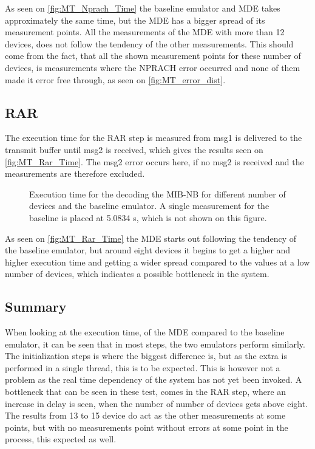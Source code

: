 As seen on \autoref{fig:MT_Nprach_Time} the baseline emulator and MDE takes approximately the same time, but the MDE has a bigger spread of its measurement points. All the measurements of the MDE with more than 12 devices, does not follow the tendency of the other measurements. This should come from the fact, that all the shown measurement points for these number of devices, is measurements where the NPRACH error occurred and none of them made it error free through, as seen on \autoref{fig:MT_error_dist}.

\subsection{RAR}
The execution time for the RAR step is measured from msg1 is delivered to the transmit buffer until msg2 is received, which gives the results seen on \autoref{fig:MT_Rar_Time}. The msg2 error occurs here, if no msg2 is received and the measurements are therefore excluded. 

\begin{figure}[H]
\centering
\resizebox{0.5\textwidth}{!}{
}
\caption{Execution time for the decoding the MIB-NB for different number of devices and the baseline emulator. A single measurement for the baseline is placed at 5.0834 s, which is not shown on this figure.}
\label{fig:MT_Rar_Time}
\end{figure}

As seen on \autoref{fig:MT_Rar_Time} the MDE starts out following the tendency of the baseline emulator, but around eight devices it begins to get a higher and higher execution time and getting a wider spread compared to the values at a low number of devices, which indicates a possible bottleneck in the system.

\subsection{Summary}
When looking at the execution time, of the MDE compared to the baseline emulator, it can be seen that in most steps, the two emulators perform similarly. The initialization steps is where the biggest difference is, but as the extra is performed in a single thread, this is to be expected. This is however not a problem as the real time dependency of the system has not yet been invoked. A bottleneck that can be seen in these test, comes in the RAR step, where an increase in delay is seen, when the number of number of devices gets above eight. The results from 13 to 15 device do act as the other measurements at some points, but with no measurements point without errors at some point in the process, this expected as well. 


